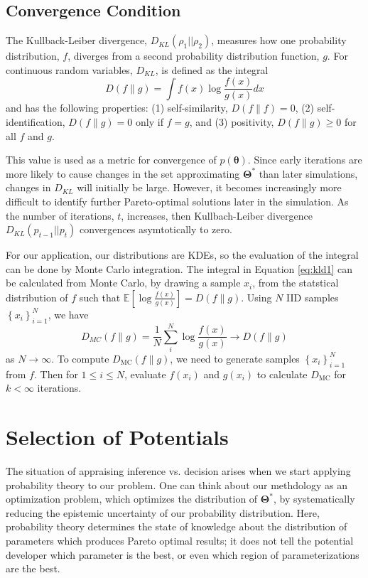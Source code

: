 
\subsection{Convergence Condition}
The Kullback-Leiber divergence\cite{kullback1951_kld}, $D_{KL}(\rho_1\vert\vert\rho_2)$, measures how one probability distribution, $f$, diverges from a second probability distribution function, $g$.  For continuous random variables, $D_{KL}$, is defined as the integral
\begin{equation}
\label{eq:kld1}
   D(f \parallel g) = \int f(x) \log \frac{f(x)}
                                          {g(x)} dx
\end{equation}
and has the following properties: (1) self-similarity, $D(f \parallel f) = 0$, (2) self-identification, $D(f \parallel g) = 0$ only if $f=g$, and (3) positivity, $D(f \parallel g) \geq 0$ for all $f$ and $g$.

This value is used as a metric for convergence of $p(\bm{\theta})$.
Since early iterations are more likely to cause changes in the set approximating $\bm{\Theta}^*$ than later simulations, changes in $D_{KL}$ will initially be large.  However, it becomes increasingly more difficult to identify further Pareto-optimal solutions later in the simulation.  As the number of iterations, $t$, increases, then Kullbach-Leiber divergence $D_{KL}(p_{t-1}\vert\vert p_t)$ convergences asymtotically to zero.

For our application, our distributions are KDEs, so the evaluation of the integral can be done by Monte Carlo integration.  The integral in Equation \ref{eq:kld1} can be calculated from Monte Carlo\cite{hershey2007_kld_approx}, by drawing a sample $x_i$, from the statstical distribution of $f$ such that $\mathbb{E}\left[\log\frac{f(x)}{g(x)}\right] = D(f \parallel g)$.  Using $N$ IID samples $\left\{x_i\right\}_{i=1}^N$, we have
\begin{equation}
  \label{eq:kdmc}
  D_{MC}(f \parallel g) = \frac{1}{N}\sum_i^N \log \frac{f(x)}{g(x)}
      \rightarrow D(f \parallel g)
\end{equation}
as $N \rightarrow \infty$.  To compute {$D_{\mathrm{MC}}(f \parallel g)$}, we need to generate samples $\left\{x_i\right\}_{i=1}^N$ from $f$.  Then for $1 \leq i \leq N$, evaluate $f(x_i)$ and $g(x_i)$ to calculate $D_{\mathrm{MC}}$
for $k < \infty$ iterations.

\section{Selection of Potentials}
\label{sec:selection}
The situation of appraising inference vs. decision arises when we start applying probability theory to our problem.  One can think about our methdology as an optimization problem, which optimizes the distribution of $\bm{\Theta}^*$, by systematically reducing the epistemic uncertainty of our probability distribution.  Here, probability theory determines the state of knowledge about the distribution of parameters which produces Pareto optimal results; it does not tell the potential developer which parameter is the best, or even which region of parameterizations are the best.

